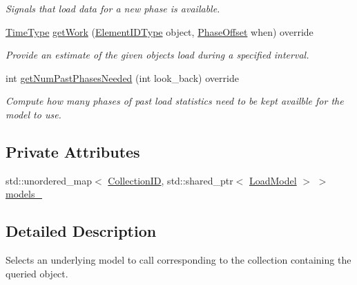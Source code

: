 \begin{DoxyCompactItemize}
\begin{DoxyCompactList}\small\item\em Signals that load data for a new phase is available. \end{DoxyCompactList}\item 
\hyperlink{namespacevt_a876a9d0cd5a952859c72de8a46881442}{Time\+Type} \hyperlink{structvt_1_1vrt_1_1collection_1_1balance_1_1_per_collection_a39813c26fddb8c8cdd6996187f42c173}{get\+Work} (\hyperlink{namespacevt_1_1vrt_1_1collection_1_1balance_a14c8d2c972f2913aa3f1636e5be0a120}{Element\+I\+D\+Type} object, \hyperlink{structvt_1_1vrt_1_1collection_1_1balance_1_1_phase_offset}{Phase\+Offset} when) override
\begin{DoxyCompactList}\small\item\em Provide an estimate of the given object\textquotesingle{}s load during a specified interval. \end{DoxyCompactList}\item 
int \hyperlink{structvt_1_1vrt_1_1collection_1_1balance_1_1_per_collection_aad4e752227fdf875194673cfb98e04e6}{get\+Num\+Past\+Phases\+Needed} (int look\+\_\+back) override
\begin{DoxyCompactList}\small\item\em Compute how many phases of past load statistics need to be kept availble for the model to use. \end{DoxyCompactList}\end{DoxyCompactItemize}
\subsection*{Private Attributes}
\begin{DoxyCompactItemize}
\item 
std\+::unordered\+\_\+map$<$ \hyperlink{structvt_1_1vrt_1_1collection_1_1balance_1_1_per_collection_ade08a6857f727a0a9d1ef63b25fc5b71}{Collection\+ID}, std\+::shared\+\_\+ptr$<$ \hyperlink{classvt_1_1vrt_1_1collection_1_1balance_1_1_load_model}{Load\+Model} $>$ $>$ \hyperlink{structvt_1_1vrt_1_1collection_1_1balance_1_1_per_collection_aec76660b4a44fe451a9546b4f4c50d3d}{models\+\_\+}
\end{DoxyCompactItemize}


\subsection{Detailed Description}
Selects an underlying model to call corresponding to the collection containing the queried object. 

